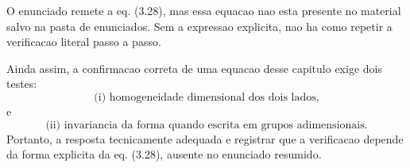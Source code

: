 O enunciado remete a eq. (3.28), mas essa equacao nao esta presente no material salvo na pasta de enunciados. Sem a expressao explicita, nao ha como repetir a verificacao literal passo a passo.

Ainda assim, a confirmacao correta de uma equacao desse capitulo exige dois testes:
\[
\text{(i) homogeneidade dimensional dos dois lados,}
\]
e
\[
\text{(ii) invariancia da forma quando escrita em grupos adimensionais.}
\]
Portanto, a resposta tecnicamente adequada e registrar que a verificacao depende da forma explicita da eq. (3.28), ausente no enunciado resumido.


